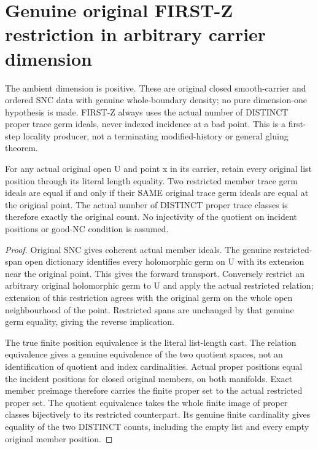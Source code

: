 \section{Genuine original FIRST-Z restriction in arbitrary carrier dimension}

The ambient dimension is positive. These are original closed smooth-carrier and
ordered SNC data with genuine whole-boundary density; no pure dimension-one
hypothesis is made. FIRST-Z always uses the actual number of DISTINCT proper
trace germ ideals, never indexed incidence at a bad point. This is a first-step
locality producer, not a terminating modified-history or general gluing theorem.

\begin{theorem}
\label{hir:sharp-original-first-trace-quotient-open-dictionary}
\leanok
For any actual original open U and point x in its carrier, retain every
original list position through its literal length equality. Two restricted
member trace germ ideals are equal if and only if their SAME original trace
germ ideals are equal at the original point. The actual number of DISTINCT
proper trace classes is therefore exactly the original count. No injectivity
of the quotient on incident positions or good-NC condition is assumed.
\end{theorem}
\begin{proof}
Original SNC gives coherent actual member ideals. The genuine restricted-span
open dictionary identifies every holomorphic germ on U with its extension
near the original point. This gives the forward transport. Conversely restrict
an arbitrary original holomorphic germ to U and apply the actual restricted
relation; extension of this restriction agrees with the original germ on the
whole open neighbourhood of the point. Restricted spans are unchanged by
that genuine germ equality, giving the reverse implication.

The true finite position equivalence is the literal list-length cast. The
relation equivalence gives a genuine equivalence of the two quotient spaces,
not an identification of quotient and index cardinalities. Actual proper
positions equal the incident positions for closed original members, on both
manifolds. Exact member preimage therefore carries the finite proper set to
the actual restricted proper set. The quotient equivalence takes the whole
finite image of proper classes bijectively to its restricted counterpart.
Its genuine finite cardinality gives equality of the two DISTINCT counts,
including the empty list and every empty original member position.
\end{proof}

